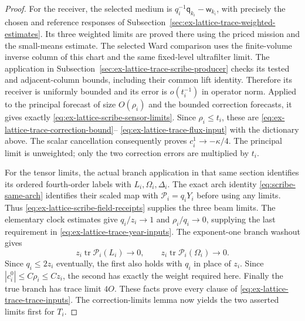 \begin{proof}
For the receiver, the selected medium is
$q_i^{-1}\mathsf q_{k_i}-\mathsf w_{k_i}$, with precisely the chosen
and reference responses of
Subsection~\ref{sec:ex-lattice-trace-weighted-estimates}. Its three
weighted limits are proved there using the priced mission and the
small-means estimate. The selected Ward comparison uses the finite-volume inverse
column of this chart and the same fixed-level ultrafilter limit. The
application in Subsection~\ref{sec:ex-lattice-trace-scribe-producer}
checks its tested and adjacent-column bounds, including their common
lift identity. Therefore its receiver is uniformly bounded and its
error is $o(t_i^{-1})$ in operator norm. Applied to the principal
forecast of size $O(\rho_i)$ and the bounded correction forecasts, it
gives exactly \eqref{eq:ex-lattice-scribe-sensor-limits}. Since
$\rho_i\le t_i$, these are
\eqref{eq:ex-lattice-trace-correction-bound}--
\eqref{eq:ex-lattice-trace-flux-input} with the dictionary above.
The scalar cancellation consequently proves $c_i^1\to-\kappa/4$.
The principal limit is unweighted; only the two correction errors
are multiplied by $t_i$.

For the tensor limits, the actual branch application in that same
section identifies its ordered fourth-order labels with
$L_i,\Omega_i,\Delta_i$. The exact arch identity
\eqref{eq:scribe-same-arch} identifies their scaled map with
$\mathcal P_i=q_iY_i$ before using any limits. Thus
\eqref{eq:ex-lattice-scribe-field-receipts} supplies the three beam
limits. The elementary clock estimates give $q_i/z_i\to1$ and
$\rho_i/q_i\to0$, supplying the last requirement in
\eqref{eq:ex-lattice-trace-year-inputs}. The exponent-one branch
washout gives
\[
 z_i\operatorname{tr}\mathcal P_i(L_i)\to0,
 \qquad z_i\operatorname{tr}\mathcal P_i(\Omega_i)\to0.
\]
Since $q_i\le2z_i$ eventually, the first also holds with $q_i$ in
place of $z_i$. Since $|c_i^0|\le C\rho_i\le Cz_i$, the second has
exactly the weight required here. Finally the true branch has trace
limit $4O$. These facts prove every clause of
\eqref{eq:ex-lattice-trace-trace-inputs}. The correction-limits lemma
now yields the two asserted limits first for $T_i$.


\end{proof}
